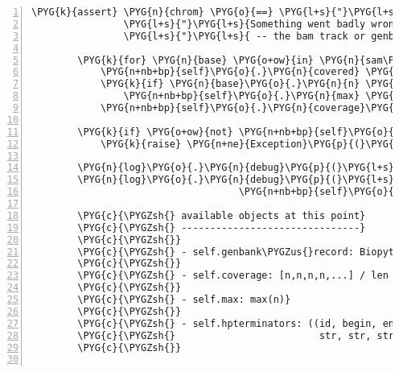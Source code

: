 \begin{Verbatim}[commandchars=\\\{\},numbers=left,firstnumber=1,stepnumber=5]
        \PYG{k}{assert} \PYG{n}{chrom} \PYG{o}{==} \PYG{l+s}{"}\PYG{l+s}{chr}\PYG{l+s}{"} \PYG{o+ow}{and} \PYG{n}{length} \PYG{o}{==} \PYG{n+nb}{len}\PYG{p}{(}\PYG{n+nb+bp}{self}\PYG{o}{.}\PYG{n}{genbank\PYGZus{}record}\PYG{o}{.}\PYG{n}{seq}\PYG{p}{)}\PYG{p}{,} \PYG{p}{(}
                \PYG{l+s}{"}\PYG{l+s}{Something went badly wrong}\PYG{l+s}{"}
                \PYG{l+s}{"}\PYG{l+s}{ -- the bam track or genbank file cold be corrupted...}\PYG{l+s}{"}\PYG{p}{)}

        \PYG{k}{for} \PYG{n}{base} \PYG{o+ow}{in} \PYG{n}{sam\PYGZus{}reader}\PYG{o}{.}\PYG{n}{pileup}\PYG{p}{(}\PYG{n}{chrom}\PYG{p}{,} \PYG{l+m+mi}{0}\PYG{p}{,} \PYG{n}{length}\PYG{p}{)}\PYG{p}{:}
            \PYG{n+nb+bp}{self}\PYG{o}{.}\PYG{n}{covered} \PYG{o}{+}\PYG{o}{=} \PYG{l+m+mi}{1}
            \PYG{k}{if} \PYG{n}{base}\PYG{o}{.}\PYG{n}{n} \PYG{o}{\textgreater{}} \PYG{n+nb+bp}{self}\PYG{o}{.}\PYG{n}{max}\PYG{p}{:}
                \PYG{n+nb+bp}{self}\PYG{o}{.}\PYG{n}{max} \PYG{o}{=} \PYG{n}{base}\PYG{o}{.}\PYG{n}{n}
            \PYG{n+nb+bp}{self}\PYG{o}{.}\PYG{n}{coverage}\PYG{p}{[}\PYG{n}{base}\PYG{o}{.}\PYG{n}{pos}\PYG{p}{]} \PYG{o}{=} \PYG{n}{base}\PYG{o}{.}\PYG{n}{n}

        \PYG{k}{if} \PYG{o+ow}{not} \PYG{n+nb+bp}{self}\PYG{o}{.}\PYG{n}{covered}\PYG{p}{:}
            \PYG{k}{raise} \PYG{n+ne}{Exception}\PYG{p}{(}\PYG{l+s}{"}\PYG{l+s}{Not a valid bam file}\PYG{l+s}{"}\PYG{p}{)}

        \PYG{n}{log}\PYG{o}{.}\PYG{n}{debug}\PYG{p}{(}\PYG{l+s}{"}\PYG{l+s}{maximum coverage: }\PYG{l+s+si}{\PYGZpc{}d}\PYG{l+s}{"} \PYG{o}{\PYGZpc{}} \PYG{n+nb+bp}{self}\PYG{o}{.}\PYG{n}{max}\PYG{p}{)}
        \PYG{n}{log}\PYG{o}{.}\PYG{n}{debug}\PYG{p}{(}\PYG{l+s}{"}\PYG{l+s}{number of bases covered by short reads: }\PYG{l+s+si}{\PYGZpc{}d}\PYG{l+s}{/}\PYG{l+s+si}{\PYGZpc{}d}\PYG{l+s}{"} \PYG{o}{\PYGZpc{}} \PYG{p}{(}
                                    \PYG{n+nb+bp}{self}\PYG{o}{.}\PYG{n}{covered}\PYG{p}{,} \PYG{n+nb}{len}\PYG{p}{(}\PYG{n+nb+bp}{self}\PYG{o}{.}\PYG{n}{genbank\PYGZus{}record}\PYG{o}{.}\PYG{n}{seq}\PYG{p}{)}\PYG{p}{)}\PYG{p}{)}

        \PYG{c}{\PYGZsh{} available objects at this point}
        \PYG{c}{\PYGZsh{} -------------------------------}
        \PYG{c}{\PYGZsh{}}
        \PYG{c}{\PYGZsh{} - self.genbank\PYGZus{}record: Biopython SeqIO.parse()d genbank file}
        \PYG{c}{\PYGZsh{}}
        \PYG{c}{\PYGZsh{} - self.coverage: [n,n,n,n,...] / len = len(self.genbank\PYGZus{}record.seq)}
        \PYG{c}{\PYGZsh{}}
        \PYG{c}{\PYGZsh{} - self.max: max(n)}
        \PYG{c}{\PYGZsh{}}
        \PYG{c}{\PYGZsh{} - self.hpterminators: ((id, begin, end, strand, confidence), ...)}
        \PYG{c}{\PYGZsh{}                         str, str, str, str (1/-), int}
        \PYG{c}{\PYGZsh{}}


\end{Verbatim}
